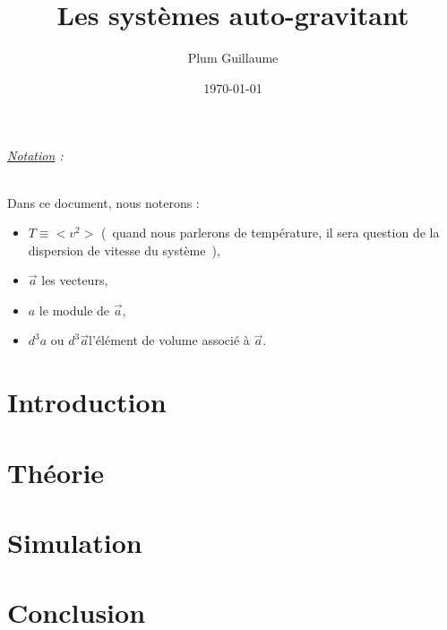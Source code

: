 \documentclass[a4paper,11pt,twoside,openright]{report}
\title{Les systèmes auto-gravitant}
\author{Plum Guillaume}
\date{\today}
\renewcommand{\(}{\ensuremath{\left(}}
\renewcommand{\)}{\ensuremath{\right)}}
\begin{document}
	\dominitoc
	

	\cleardoublepage

	\small \tableofcontents
	\listoffigures
	\listoftables

	\paragraph*{\underline{Notation} :}
	Dans ce document, nous noterons :
	\begin{itemize}
		\item $T \equiv <v^2>$ (~quand nous parlerons de température, il sera question de la dispersion de vitesse du système~),
		\item $\vec{a}$ les vecteurs,
		\item $a$ le module de $\vec{a}$,
		\item $d^3 a$ ou $d^3 \vec{a}$l'élément de volume associé à $\vec{a}$.
	\end{itemize}


	\pagestyle{fancy}
	\renewcommand{\chaptermark}[1]{\markboth{\MakeUppercase{\chaptername}\ \thechapter.\ #1}{}}


	\part{Introduction}
		

	\part{Théorie}
		


	\part{Simulation}
		

	\part*{Conclusion}
\end{document}
